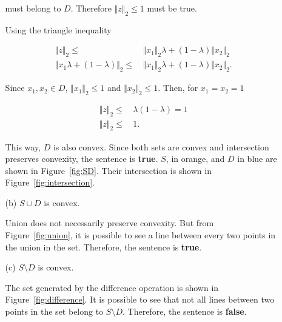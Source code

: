 \documentclass[11pt,a4paper]{article}
\begin{document}
\begin{itemize}
\begin{itemize}
        must belong to $D$. Therefore $\Vert z \Vert_2 \leq 1$ must be true.

        Using the triangle inequality

        \begin{equation*}
            \begin{aligned}
                \Vert z \Vert_2 \leq & \, \Vert x_1 \Vert_2 \lambda + (1 - \lambda)\Vert x_2 \Vert_2\\
                \Vert x_1\lambda + (1-\lambda)\Vert_2 \leq & \, \Vert x_1 \Vert_2 \lambda + (1-\lambda) \Vert x_2\Vert_2.
            \end{aligned}
        \end{equation*}

        Since $x_1, x_2 \in D$, $\Vert x_1 \Vert_2 \leq 1$ and $\Vert x_2 \Vert_2 \leq 1$. Then, for $x_1 = x_2 = 1$

        \begin{equation*}
            \begin{aligned}
                \Vert z \Vert_2 \leq \, & \lambda(1-\lambda) = 1\\
                \Vert z \Vert_2 \leq \, & 1.
            \end{aligned}
        \end{equation*}

        This way, $D$ is also convex. Since both sets are convex and intersection preserves convexity, the sentence is \textbf{true}. $S$, in orange, and $D$ in blue are shown in Figure~\ref{fig:SD}. Their intersection is shown in Figure~\ref{fig:intersection}.
 
        \item[(b)] $S \cup D$ is convex.
        
        Union does not necessarily preserve convexity. But from Figure~\ref{fig:union}, it is possible to see a line between every two points in the union in the set. Therefore, the sentence is \textbf{true}.

        \item[(c)] $S \setminus D$ is convex.  
        
        The set generated by the difference operation is shown in Figure~\ref{fig:difference}. It is possible to see that not all lines between two points in the set belong to $S \setminus D$. Therefore, the sentence is \textbf{false}.


\end{itemize}
\end{itemize}
\end{document}
